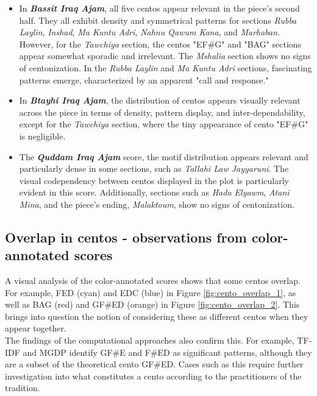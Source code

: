 \documentclass{article}
\begin{document}
\begin{itemize}
\item In \textit{\textbf{Bassit Iraq Ajam}}, all five centos appear relevant in the piece's second half. They all exhibit density and symmetrical patterns for sections \textit{Rubba Laylin}, \textit{Inshad}, \textit{Ma Kuntu Adri}, \textit{Nahnu Qawum Kana}, and \textit{Marhaban}. However, for the \textit{Tawchiya} section, the centos "EF\#G" and "BAG" sections appear somewhat sporadic and irrelevant. The \textit{Mshalia} section shows no signs of centonization. In the \textit{Rubba Laylin} and \textit{Ma Kuntu Adri} sections, fascinating patterns emerge, characterized by an apparent "call and response."

\item In \textit{\textbf{Btayhi Iraq Ajam}}, the distribution of centos appears visually relevant across the piece in terms of density, pattern display, and inter-dependability, except for the \textit{Tawchiya} section, where the tiny appearance of cento "EF\#G" is negligible.

\item The \textit{\textbf{Quddam Iraq Ajam}} score, the motif distribution appears relevant and particularly dense in some sections, such as \textit{Tallahi Law Jayyaruni}. The visual codependency between centos displayed in the plot is particularly evident in this score. Additionally, sections such as \textit{Hada Elyawm}, \textit{Atani Mina}, and the piece's ending, \textit{Malaktoum}, show no signs of centonization.
\end{itemize}

\subsection{Overlap in centos - observations from color-annotated scores}

A visual analysis of the color-annotated scores shows that some centos overlap. For example, FED (cyan) and EDC (blue) in Figure \ref{fig:cento_overlap_1}, as well as BAG (red) and GF\#ED (orange) in Figure \ref{fig:cento_overlap_2}. This brings into question the notion of considering these as different centos when they appear together.\\ 
The findings of the computational approaches also confirm this. For example, TF-IDF and MGDP identify GF\#E and F\#ED as significant patterns, although they are a subset of the theoretical cento GF\#ED. Cases such as this require further investigation into what constitutes a cento according to the practitioners of the tradition.
\end{document}
